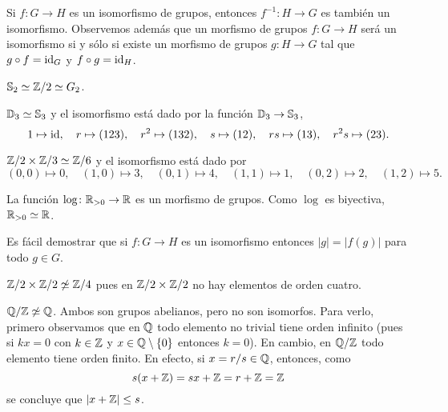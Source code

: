 %
Si $f\colon G\to H$ es un isomorfismo de grupos, entonces $f^{-1}\colon H\to G$ es también un isomorfismo. Observemos además 
que un morfismo de grupos $f\colon G\to H$ será un isomorfismo si y sólo si existe
un morfismo de grupos $g\colon H\to G$ tal que $g\circ f=\operatorname{id}_G$ y $f\circ g=\operatorname{id}_H$. 

\begin{example}
$\mathbb{S}_2\simeq\mathbb{Z}/2\simeq G_2$. 	
\end{example}

\begin{example}
$\mathbb{D}_3\simeq\mathbb{S}_3$ y el isomorfismo está dado por la función $\mathbb{D}_3\to\mathbb{S}_3$, 
\[
1\mapsto \operatorname{id},\quad 
r\mapsto (123),\quad r^2\mapsto(132),\quad s\mapsto(12),\quad rs\mapsto(13),\quad r^2s\mapsto(23).
\]	
\end{example}

\begin{example}
$\mathbb{Z}/2\times\mathbb{Z}/3\simeq\mathbb{Z}/6$ y el isomorfismo está dado por 
\[
(0,0)\mapsto 0,\quad (1,0)\mapsto 3,\quad
(0,1)\mapsto 4,\quad (1,1)\mapsto 1,\quad (0,2)\mapsto 2,\quad (1,2)\mapsto 5.
\]	
\end{example}

\begin{example}
La función $\log\colon\mathbb{R}_{>0}\to\mathbb{R}$ es un morfismo de grupos. Como $\log$ es biyectiva, 
$\mathbb{R}_{>0}\simeq\mathbb{R}$.
\end{example}

Es fácil demostrar que si $f\colon G\to H$ es un isomorfismo entonces $|g|=|f(g)|$ para todo $g\in G$. 

\begin{example}
$\mathbb{Z}/2\times\mathbb{Z}/2\not\simeq\mathbb{Z}/4$ pues en $\mathbb{Z}/2\times\mathbb{Z}/2$ no hay elementos de orden cuatro. 
\end{example}

\begin{example}
$\mathbb{Q}/\mathbb{Z}\not\simeq\mathbb{Q}$. Ambos son grupos abelianos, pero no son isomorfos. 
Para verlo, primero observamos que en $\mathbb{Q}$ todo elemento no trivial tiene orden 
infinito (pues si $kx=0$ con $k\in\mathbb{Z}$ y $x\in\mathbb{Q}\setminus\{0\}$ entonces $k=0$). 
En cambio, en $\mathbb{Q}/\mathbb{Z}$ todo elemento tiene orden finito. En efecto, si $x=r/s\in\mathbb{Q}$, entonces, como
\[
s(x+\mathbb{Z})=sx+\mathbb{Z}=r+\mathbb{Z}=\mathbb{Z}
\]
se concluye que $|x+\mathbb{Z}|\leq s$. 
\end{example}

